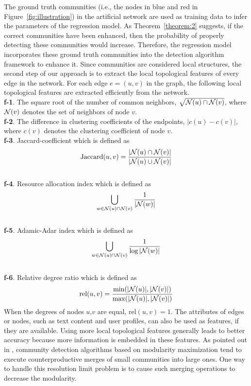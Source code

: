 The ground truth communities (i.e., the nodes in blue and red in Figure~\ref{fig:illustration}) in the artificial network are used as training data to infer the parameters of the regression model. As Theorem~\ref{theorem:2} suggests, if the correct communities have been enhanced, then the probability of properly detecting these communities would increase. Therefore, the regression model incorporates these ground truth communities into the detection algorithm framework to enhance it.
Since communities are considered local structures, the second step of our approach is to extract the local topological features of every edge in the network. For each edge $e=(u,v)$ in the graph, the following local topological features are extracted efficiently from the network.
\\
\textbf{f-1}. The square root of the number of common neighbors, $\sqrt{\mathcal{N}(u) \cap \mathcal{N}(v)}$, where $\mathcal{N}(v)$ denotes the set of neighbors of node $v$. 
\\
\textbf{f-2}. The difference in clustering coefficients of the endpoints, $|c(u) - c(v)|$, where $c(v)$ denotes the clustering coefficient of node $v$. 
\\
\textbf{f-3}. Jaccard-coefficient which is defined as
\begin{equation}
\text{Jaccard}(u,v) = \frac{|\mathcal{N}(u) \cap \mathcal{N}(v) |}{|\mathcal{N}(u) \cup \mathcal{N}(v) |}
\end{equation}
\\
\textbf{f-4}. Resource allocation index which is defined as
\begin{equation}
\bigcup_{w \in \mathcal{N}(u) \cap \mathcal{N}(v)} \frac{1}{|\mathcal{N}(w)|}
\end{equation}
\\
\textbf{f-5}. Adamic-Adar index which is defined as
\begin{equation}
\bigcup_{w \in \mathcal{N}(u) \cap \mathcal{N}(v)} \frac{1}{\log|\mathcal{N}(w)|}
\end{equation}
\\
\textbf{f-6}. Relative degree ratio which is defined as
\begin{equation}
\text{rel}(u,v) = \frac{\min(|\mathcal{N}(u)|,|\mathcal{N}(v)|) }{\max(|\mathcal{N}(u)|,|\mathcal{N}(v)|)}
\end{equation}
When the degrees of nodes $u$,$v$ are equal, $\text{rel}(u,v) = 1$.
The attributes of edges or nodes, such as text content and user profiles, can also be used as features, if they are available. Using more local topological features generally leads to better accuracy because more information is embedded in these features.
As pointed out in \cite{fortunato2007resolution}, community detection algorithms based on modularity maximization tend to execute counterproductive merges of small communities into large ones. One way to handle this resolution limit problem is to cause such merging operations to decrease the modularity. 
